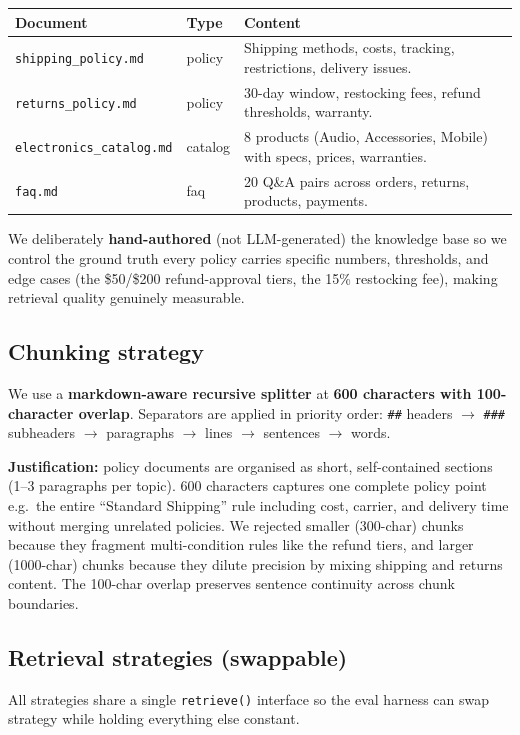 \documentclass[11pt,a4paper]{article}
\newcommand{\code}[1]{\texttt{#1}}
\begin{document}
\begin{tabularx}{\textwidth}{@{}>{\raggedright\arraybackslash}p{3.6cm}>{\raggedright\arraybackslash}p{1.6cm}Y@{}}
\toprule
\textbf{Document} & \textbf{Type} & \textbf{Content} \\
\midrule
\code{shipping\_policy.md}     & policy  & Shipping methods, costs, tracking, restrictions, delivery issues. \\
\code{returns\_policy.md}      & policy  & 30-day window, restocking fees, refund thresholds, warranty. \\
\code{electronics\_catalog.md} & catalog & 8 products (Audio, Accessories, Mobile) with specs, prices, warranties. \\
\code{faq.md}                  & faq     & 20 Q\&A pairs across orders, returns, products, payments. \\
\bottomrule
\end{tabularx}

We deliberately \textbf{hand-authored} (not LLM-generated) the knowledge base so we control the
ground truth \textemdash{} every policy carries specific numbers, thresholds, and edge cases (the
\$50/\$200 refund-approval tiers, the 15\% restocking fee), making retrieval quality genuinely
measurable.

\subsection{Chunking strategy}
We use a \textbf{markdown-aware recursive splitter} at \textbf{600 characters with 100-character
overlap}. Separators are applied in priority order: \code{\#\#} headers $\to$ \code{\#\#\#}
subheaders $\to$ paragraphs $\to$ lines $\to$ sentences $\to$ words.

\textbf{Justification:} policy documents are organised as short, self-contained sections (1--3
paragraphs per topic). 600 characters captures one complete policy point \textemdash{} e.g.\ the
entire ``Standard Shipping'' rule including cost, carrier, and delivery time \textemdash{} without
merging unrelated policies. We rejected smaller (300-char) chunks because they fragment
multi-condition rules like the refund tiers, and larger (1000-char) chunks because they dilute
precision by mixing shipping and returns content. The 100-char overlap preserves sentence
continuity across chunk boundaries.

\subsection{Retrieval strategies (swappable)}
All strategies share a single \code{retrieve()} interface so the eval harness can swap strategy
while holding everything else constant.
\end{document}

